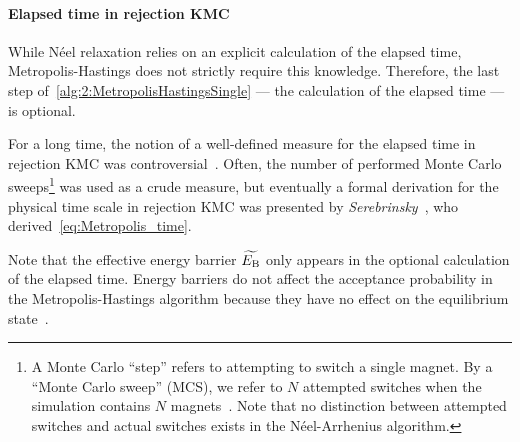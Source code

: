 \paragraph{Elapsed time in rejection KMC}
While N\'eel relaxation relies on an explicit calculation of the elapsed time, Metropolis-Hastings does not strictly require this knowledge.
Therefore, the last step of~\cref{alg:2:MetropolisHastingsSingle} --- the calculation of the elapsed time --- is optional. \par
For a long time, the notion of a well-defined measure for the elapsed time in rejection KMC was controversial~\cite{nfoldMCalgorithm,GlauberTimescale_sadiq1984,MCSim_StatPhys}. %
Often, the number of performed Monte Carlo sweeps\footnote{
	A Monte Carlo ``step'' refers to attempting to switch a single magnet. By a ``Monte Carlo sweep'' (MCS), we refer to $N$ attempted switches when the simulation contains $N$ magnets~\cite{NumericalDynamicalNiedermayer}. Note that no distinction between attempted switches and actual switches exists in the N\'eel-Arrhenius algorithm.
} was used as a crude measure, but eventually a formal derivation for the physical time scale in rejection KMC was presented by \textit{Serebrinsky}~\cite{PhysicalTimeKMC}, who derived~\cref{eq:Metropolis_time}. \par
Note that the effective energy barrier $\widetilde{E_\mathrm{B}}$ only appears in the optional calculation of the elapsed time.
Energy barriers do not affect the acceptance probability in the Metropolis-Hastings algorithm because they have no effect on the equilibrium state~\cite{DynamicalGlassyBehaviour}.

